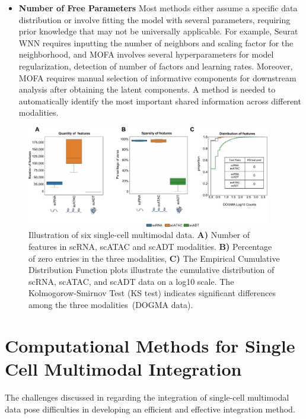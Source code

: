 \begin{itemize}
    \item \textbf{Number of Free Parameters}
    Most methods either assume a specific data distribution or involve fitting the model with several parameters, requiring prior knowledge that may not be universally applicable. For example, Seurat WNN requires inputting the number of neighbors and scaling factor for the neighborhood, and MOFA involves several hyperparameters for model regularization, detection of number of factors and learning rates. Moreover, MOFA requires manual selection of informative components for downstream analysis after obtaining the latent components. A method is needed to automatically identify the most important shared information across different modalities.

\end{itemize}

\begin{figure}[!ht]
	\centering
	\includegraphics[width=0.95\textwidth]{feature_statistic/fig}
	\vspace{0.1cm}
	\caption[features characteristics comparison showing the challenge of multimodal integration.]{Illustration of six single-cell multimodal data. \textbf{A)} Number of features in scRNA, scATAC and scADT modalities. \textbf{B)} Percentage of zero entries in the three modalities, \textbf{C)} The Empirical Cumulative Distribution Function plots illustrate the cumulative distribution of scRNA, scATAC, and scADT data on a log10 scale. The Kolmogorow-Smirnov Test (KS test) indicates significant differences among the three modalities~(DOGMA data).}
	\label{fig:modalities_differences}
\end{figure}



\section{Computational Methods for Single Cell Multimodal Integration}
\label{bgInte:integration}
The challenges discussed in  regarding the integration of single-cell multimodal data pose difficulties in developing an efficient and effective integration method.

